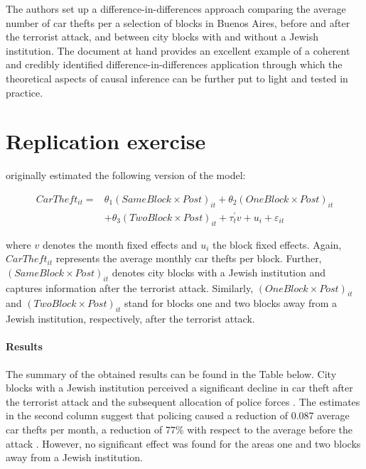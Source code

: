 \documentclass[11pt, a4paper, leqno]{article}
\begin{document}
The authors set up a difference-in-differences approach comparing the average number of car thefts per a selection of blocks in Buenos Aires, before and after the terrorist attack, and between city blocks with and without a Jewish institution. The document at hand provides an excellent example of a coherent and credibly identified difference-in-differences application through which the theoretical aspects of causal inference can be further put to light and tested in practice.

\section{Replication exercise}

\citeauthor{di2004police} originally estimated the following version of the model:

\begin{equation}\label{did_mode_1}
\begin{aligned}
CarTheft_{it} = & \theta_1 (Same Block \times Post)_{it} + \theta_2(One Block \times Post)_{it} \\
& + \theta_3(Two Block \times Post)_{it} + \tau_t^\prime v + u_i + \varepsilon_{it}
\end{aligned}
\end{equation}

where $v$ denotes the month fixed effects and $u_i$ the block fixed effects. Again, $CarTheft_{it}$ represents the average monthly car thefts per block. Further, $(Same Block \times Post)_{it}$ denotes city blocks with a Jewish institution and captures information after the terrorist attack. Similarly, $(One Block \times Post)_{it}$ and $(Two Block \times Post)_{it}$ stand for blocks one and two blocks away from a Jewish institution, respectively, after the terrorist attack.


\paragraph{Results}

The summary of the obtained results can be found in the Table below. City blocks with a Jewish institution perceived a significant decline in car theft after the terrorist attack and the subsequent allocation of police forces . The estimates in the second column suggest that policing caused a reduction of 0.087 average car thefts per month, a reduction of 77\% with respect to the average before the attack . However, no significant effect was found for the areas one and two blocks away from a Jewish institution.
\end{document}
